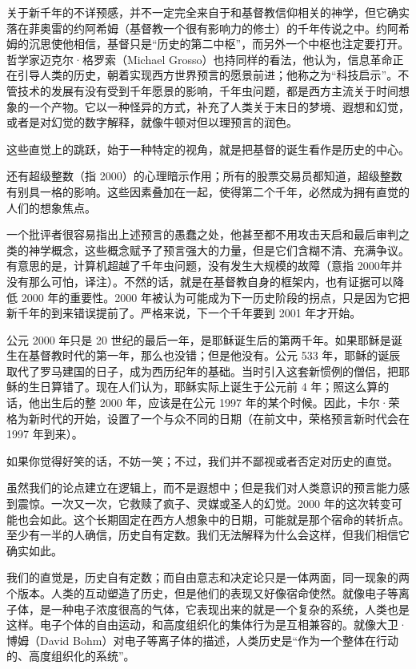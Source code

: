 关于新千年的不详预感，并不一定完全来自于和基督教信仰相关的神学，但它确实落在菲奥雷的约阿希姆（基督教一个很有影响力的修士）的千年传说之中。约阿希姆的沉思使他相信，基督只是“历史的第二中枢”，而另外一个中枢也注定要打开。哲学家迈克尔·格罗索（Michael Grosso）也持同样的看法，他认为，信息革命正在引导人类的历史，朝着实现西方世界预言的愿景前进；他称之为“科技启示”。不管技术的发展有没有受到千年愿景的影响，千年虫问题，都是西方主流关于时间想象的一个产物。它以一种怪异的方式，补充了人类关于末日的梦境、遐想和幻觉，或者是对幻觉的数字解释，就像牛顿对但以理预言的润色。


这些直觉上的跳跃，始于一种特定的视角，就是把基督的诞生看作是历史的中心。


还有超级整数（指 2000）的心理暗示作用；所有的股票交易员都知道，超级整数有别具一格的影响。这些因素叠加在一起，使得第二个千年，必然成为拥有直觉的人们的想象焦点。


一个批评者很容易指出上述预言的愚蠢之处，他甚至都不用攻击天启和最后审判之类的神学概念，这些概念赋予了预言强大的力量，但是它们含糊不清、充满争议。有意思的是，计算机超越了千年虫问题，没有发生大规模的故障（意指 2000年并没有那么可怕，译注）。不然的话，就是在基督教自身的框架内，也有证据可以降低 2000 年的重要性。2000 年被认为可能成为下一历史阶段的拐点，只是因为它把新千年的到来错误提前了。严格来说，下一个千年要到 2001 年才开始。


公元 2000 年只是 20 世纪的最后一年，是耶稣诞生后的第两千年。如果耶稣是诞生在基督教时代的第一年，那么也没错；但是他没有。公元 533 年，耶稣的诞辰取代了罗马建国的日子，成为西历纪年的基础。当时引入这套新惯例的僧侣，把耶稣的生日算错了。现在人们认为，耶稣实际上诞生于公元前 4 年；照这么算的话，他出生后的整 2000 年，应该是在公元 1997 年的某个时候。因此，卡尔·荣格为新时代的开始，设置了一个与众不同的日期（在前文中，荣格预言新时代会在 1997 年到来）。


如果你觉得好笑的话，不妨一笑；不过，我们并不鄙视或者否定对历史的直觉。


虽然我们的论点建立在逻辑上，而不是遐想中；但是我们对人类意识的预言能力感到震惊。一次又一次，它救赎了疯子、灵媒或圣人的幻觉。2000 年的这次转变可能也会如此。这个长期固定在西方人想象中的日期，可能就是那个宿命的转折点。至少有一半的人确信，历史自有定数。我们无法解释为什么会这样，但我们相信它确实如此。


我们的直觉是，历史自有定数；而自由意志和决定论只是一体两面，同一现象的两个版本。人类的互动塑造了历史，但是他们的表现又好像宿命使然。就像电子等离子体，是一种电子浓度很高的气体，它表现出来的就是一个复杂的系统，人类也是这样。电子个体的自由运动，和高度组织化的集体行为是互相兼容的。就像大卫·博姆（David Bohm）对电子等离子体的描述，人类历史是“作为一个整体在行动的、高度组织化的系统”。


